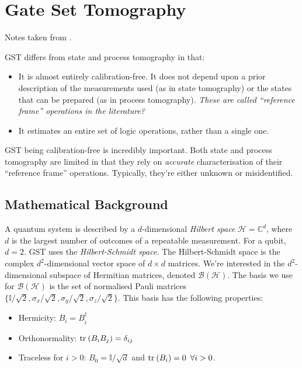 \section{Gate Set Tomography}

Notes taken from \cite{nielsen_gate_2020}.


\noindent \ac{GST} differs from state and process tomography in that:
\begin{itemize}
    \item It is almost entirely calibration-free. It does not depend upon a prior description of the
    measurements used (as in state tomography) or the states that can be prepared (as in process
    tomography). \textit{These are called ``reference frame'' operations in the literature?}
    \item It estimates an entire set of logic operations, rather than a single one.
\end{itemize}

\ac{GST} being calibration-free is incredibly important. Both state and process tomography are
limited in that they rely on \textit{accurate} characterisation of their ``reference frame''
operations. Typically, they're either unknown or misidentified.

\subsection{Mathematical Background}


A quantum system is described by a $d$-dimensional \textit{Hilbert space} $\mathcal{H} =
\mathbb{C}^d$, where $d$ is the largest number of outcomes of a repeatable measurement. For a qubit,
$d = 2$. GST uses the \textit{Hilbert-Schmidt space}. The Hilbert-Schmidt space is the complex
$d^2$-dimensional vector space of $d \times d$ matrices. We're interested in the $d^2$-dimensional
subspace of Hermitian matrices, denoted $\mathcal{B(H)}$. The basis we use for $\mathcal{B(H)}$ is
the set of normalised Pauli matrices $\{ \mathbb{I} / \sqrt{2}, \sigma_x / \sqrt{2}, \sigma_y /
\sqrt{2}, \sigma_z / \sqrt{2} \}$. This basis has the following properties:
\begin{itemize}
    \item Hermicity: $B_i = B_i^{\dagger}$
    \item Orthonormality: $\text{tr}_{}\left(B_i B_j\right) = \delta_{ij}$
    \item Traceless for $i > 0$: $B_0 = \mathbb{I} / \sqrt{d}$ and $\text{tr}_{}\left(B_i\right) = 0 \enspace \forall{i}
    > 0$.
\end{itemize}

